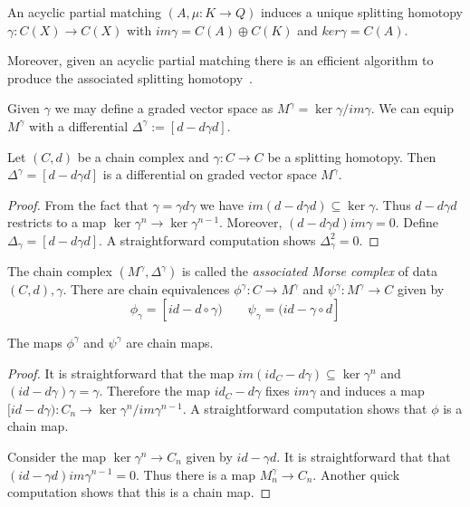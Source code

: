 \begin{prop}\label{prop:matchinghomotopy}
An acyclic partial matching $(A,\mu:K\to Q)$ induces a unique splitting homotopy $\gamma:C(X)\to C(X)$ with $im\gamma = C(A)\oplus C(K)$ and $ker\gamma = C(A)$.
\end{prop}

Moreover, given an acyclic partial matching there is an efficient algorithm to produce the associated splitting homotopy~\cite[Algorithm 3.12 (Gamma Algorithm)]{focm}.  



Given $\gamma$ we may define a graded vector space as $M^\gamma = \ker\gamma/ im \gamma$.  We can equip $M^\gamma$ with a differential $\Delta^\gamma:=[d-d\gamma d]$.

\begin{prop}
Let $(C,d)$ be a chain complex and $\gamma:C\to C$ be a splitting homotopy.  Then $\Delta^\gamma = [d-d\gamma d]$ is a differential on graded vector space $M^\gamma$.
\end{prop}
\begin{proof}
From the fact that $\gamma = \gamma d \gamma$ we have $im(d-d\gamma d)\subseteq \ker \gamma$.  Thus $d-d\gamma d$ restricts to a map $\ker\gamma^n \to \ker\gamma^{n-1}$. Moreover, $(d-d\gamma d)im\gamma= 0$.  Define $\Delta_\gamma=[d - d\gamma d]$.  A straightforward computation shows $\Delta_\gamma^2 = 0$.
\end{proof}


The chain complex $(M^\gamma,\Delta^\gamma)$ is called the {\em associated Morse complex} of data $(C,d),\gamma$.  There are chain equivalences $\phi^\gamma:C\to M^\gamma$ and $\psi^\gamma:M^\gamma\to C$ given by $$\phi_\gamma =[id - d \circ \gamma)\quad\quad \psi_\gamma = (id - \gamma\circ d]$$

\begin{prop}
The maps $\phi^\gamma$ and $\psi^\gamma$ are chain maps.
\end{prop}
\begin{proof}
It is straightforward that the map $im(id_C-d\gamma)\subseteq \ker \gamma^n$ and $(id-d\gamma)\gamma = \gamma$.  Therefore the map $id_C-d\gamma$ fixes $im\gamma$ and induces a map $[id-d\gamma):C_n\to \ker\gamma^n/im\gamma^{n-1}$.  A straightforward computation shows that $\phi$ is a chain map.

Consider the map $\ker\gamma^n \to C_n$ given by $id-\gamma d$.  It is straightforward that that $(id-\gamma d)im\gamma^{n-1}=0$.  Thus there is a map $M^\gamma_n\to C_n$.  Another quick computation shows that this is a chain map.
\end{proof}

